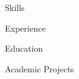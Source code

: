 \documentclass{resume} %
\begin{document}

\begin{rSection}{Skills}

\end{rSection}



\begin{rSection}{Experience}

\end{rSection}


\begin{rSection}{Education}

\end{rSection}

\pagebreak


\begin{rSection}{Academic Projects}

\end{rSection}

\end{document}
